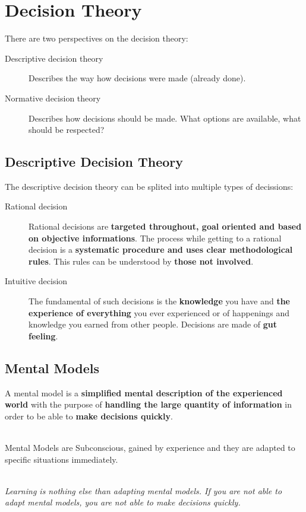 \section{Decision Theory}
There are two perspectives on the decision theory:

\begin{description}
	\item[Descriptive decision theory] Describes the way how decisions
	were made (already done).
	\item[Normative decision theory] Describes how decisions
	should be made. What options are available, what should be respected?
\end{description}

\subsection{Descriptive Decision Theory}
The descriptive decision theory can be splited into multiple types of decissions:

\begin{description}
	\item[Rational decision] Rational decisions are	\textbf{targeted
	throughout, goal oriented and based on objective informations}.
	The process while getting to a rational decision is a
	\textbf{systematic procedure and uses clear methodological rules}.
	This rules can be understood by \textbf{those not involved}.
	\item[Intuitive decision] The fundamental of such decisions is the
	\textbf{knowledge} you have and \textbf{the experience of everything}
	you ever experienced or of happenings and knowledge you earned from
	other people. Decisions are made of \textbf{gut feeling}.
\end{description}

\subsection{Mental Models}
A mental model is a \textbf{simplified mental description of
the experienced world} with the purpose of \textbf{handling the large
quantity of information} in order to be able to \textbf{make decisions
quickly}.

\mbox{}\\
Mental Models are Subconscious, gained by experience and they are adapted to
specific situations immediately.

\mbox{}\\
\emph{Learning is nothing else than adapting mental models.
If you are not able to adapt mental models, you are not able 
to make decisions quickly.}


